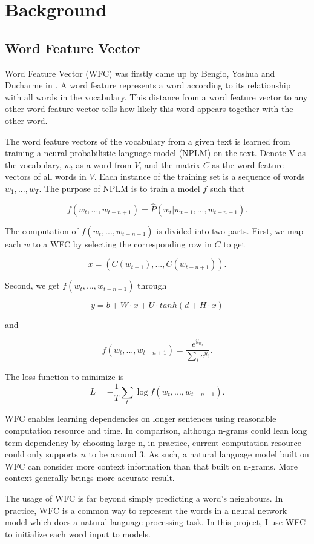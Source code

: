 \documentclass[modernstyle,12pt]{sjsuthesis}
\theoremstyle{definition}
\begin{document}
\chapter{Background}\label{chap:background}
\section{Word Feature Vector}

Word Feature Vector (WFC) was firstly came up by Bengio, Yoshua and Ducharme in \cite{bengio2003neural}. A word feature represents a word according to its relationship with all words in the vocabulary. This distance from a word feature vector to any other word feature vector tells how likely this word appears together with the other word.

The word feature vectors of the vocabulary from a given text is learned from training a neural probabilistic language model (NPLM) on the text. Denote V as the vocabulary, $w_t$ as a word from $V$, and the matrix $C$ as the word feature vectors of all words in $V$. Each instance of the training set is a sequence of words $w_1,...,w_T$. The purpose of NPLM is to train a model $f$ such that

$$ f(w_t, ..., w_{t-n+1}) = \hat{P}(w_t | w_{t-1},...,w_{t-n+1}).$$

The computation of $f(w_t, ..., w_{t-n+1})$ is divided into two parts.
First, we map each $w$ to a WFC by selecting the corresponding row in $C$ to get

$$x=(C(w_{t-1}),... ,C(w_{t-n+1})).$$

Second, we get $f(w_t, ..., w_{t-n+1})$ through

$$y=b+W\cdot x + U\cdot tanh(d + H\cdot x)$$

and

$$ f(w_t, ..., w_{t-n+1}) = \frac{e^{y_{w_t}}}{\sum_{i}^{}e^{y_i}}.$$

The loss function to minimize is $$L = -\frac{1}{T}\sum _{t}^{} \log{f(w_t, ..., w_{t-n+1})}.$$


WFC enables learning dependencies on longer sentences using reasonable computation resource and time. In comparison, although n-grams could lean long term dependency by choosing large n, in practice, current computation resource could only supports $n$ to be around 3. As such, a natural language model built on WFC can consider more context information than that built on n-grams. More context generally brings more accurate result.

The usage of WFC is far beyond simply predicting a word's neighbours. In practice, WFC is a common way to represent the words in a neural network model which does a natural language processing task. In this project, I use WFC to initialize each word input to models.
\end{document}
